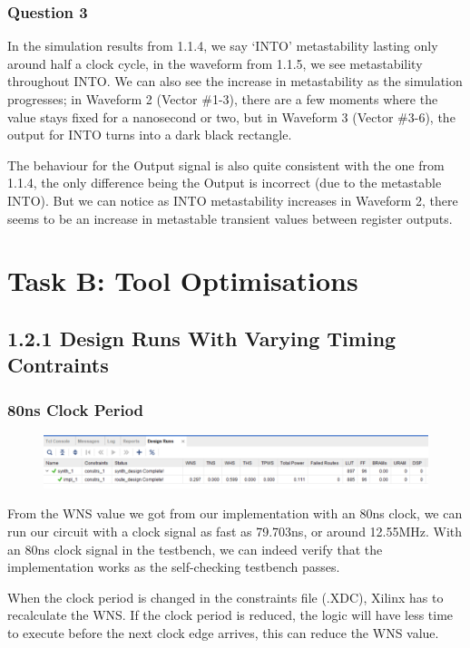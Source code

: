 \documentclass[11pt]{report}
\begin{document}
\subsection*{Question 3}
In the simulation results from 1.1.4, we say `INTO' metastability lasting only around half a clock cycle, in the waveform from 1.1.5, we see metastability throughout INTO. We can also see the increase in metastability as the simulation progresses; in Waveform 2 (Vector \#1-3), there are a few moments where the value stays fixed for a nanosecond or two, but in Waveform 3 (Vector \#3-6), the output for INTO turns into a dark black rectangle.

The behaviour for the Output signal is also quite consistent with the one from 1.1.4, the only difference being the Output is incorrect (due to the metastable INTO). But we can notice as INTO metastability increases in Waveform 2, there seems to be an increase in metastable transient values between register outputs.


\chapter*{Task B: Tool Optimisations}

\section*{1.2.1 Design Runs With Varying Timing Contraints}
\subsection*{80ns Clock Period}
\begin{figure}[H]
    \includegraphics[width=\columnwidth]{Waveforms/80ns_design-runs.png}
\end{figure}
From the WNS value we got from our implementation with an 80ns clock, we can run our circuit with a clock signal as fast as 79.703ns, or around 12.55MHz. With an 80ns clock signal in the testbench, we can indeed verify that the implementation works as the self-checking testbench passes.

When the clock period is changed in the constraints file (.XDC), Xilinx has to recalculate the WNS. If the clock period is reduced, the logic will have less time to execute before the next clock edge arrives, this can reduce the WNS value. 
\end{document}
